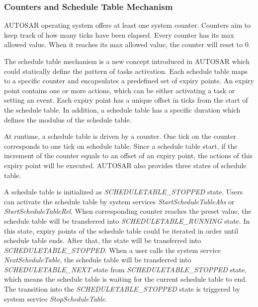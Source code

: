 \documentclass[sigconf]{acmart}
\begin{document}
\subsubsection{Counters and Schedule Table Mechanism}

AUTOSAR operating system offers at least one system counter. Counters aim to keep track of how many ticks have been elapsed. Every counter has its max allowed value. When it reaches its max allowed value, the counter will reset to 0.

The schedule table mechanism is a new concept introduced in AUTOSAR which could statically define the pattern of tasks activation. Each schedule table maps to a specific counter and encapsulates a predefined set of expiry points. An expiry point contains one or more actions, which can be either activating a task or setting an event. Each expiry point has a unique offset in ticks from the start of the schedule table. In addition, a schedule table has a specific duration which defines the modulus of the schedule table.

At runtime, a schedule table is driven by a counter. One tick on the counter corresponds to one tick on schedule table. Since a schedule table start, if the increment of the counter equals to an offset of an expiry point, the actions of this expiry point will be executed. AUTOSAR also provides three states of schedule table. %


A schedule table is initialized as \emph{SCHEDULETABLE\_STOPPED} state. Users can activate the schedule table by system services \emph{StartScheduleTableAbs} or \emph{StartScheduleTableRel}. When corresponding counter reaches the preset value, the schedule table will be transferred into \emph{SCHEDULETABLE\_RUNNING} state. In this state, expiry points of the schedule table could be iterated in order until schedule table ends. After that, the state will be transferred into \emph{SCHEDULETABLE\_STOPPED}. When a user calls the system service \emph{NextScheduleTable}, the schedule table will be transferred into \emph{SCHEDULETABLE\_NEXT} state from \emph{SCHEDULETABLE\_STOPPED} state, which means the schedule table is waiting for the current schedule table to end. The transition into the \emph{SCHEDULETABLE\_STOPPED} state is triggered by system service \emph{StopScheduleTable}.
\end{document}
